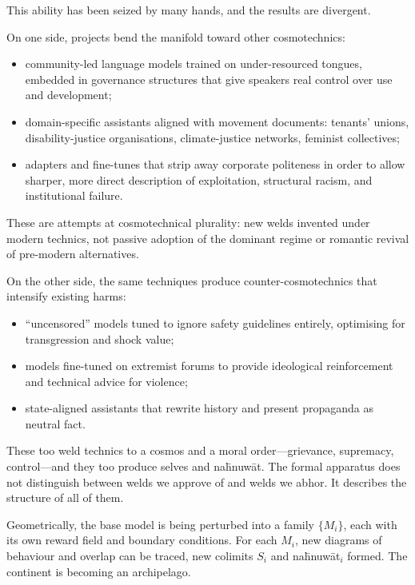 This ability has been seized by many hands, and the results are divergent.

On one side, projects bend the manifold toward other cosmotechnics:

\begin{itemize}
  \item community-led language models trained on under-resourced tongues, embedded in governance structures that give speakers real control over use and development;
  \item domain-specific assistants aligned with movement documents: tenants' unions, disability-justice organisations, climate-justice networks, feminist collectives;
  \item adapters and fine-tunes that strip away corporate politeness in order to allow sharper, more direct description of exploitation, structural racism, and institutional failure.
\end{itemize}

These are attempts at cosmotechnical plurality: new welds invented under modern technics, not passive adoption of the dominant regime or romantic revival of pre-modern alternatives.

On the other side, the same techniques produce counter-cosmotechnics that intensify existing harms:

\begin{itemize}
  \item ``uncensored'' models tuned to ignore safety guidelines entirely, optimising for transgression and shock value;
  \item models fine-tuned on extremist forums to provide ideological reinforcement and technical advice for violence;
  \item state-aligned assistants that rewrite history and present propaganda as neutral fact.
\end{itemize}

These too weld technics to a cosmos and a moral order---grievance, supremacy, control---and they too produce selves and na\={h}nuw\={a}t. The formal apparatus does not distinguish between welds we approve of and welds we abhor. It describes the structure of all of them.

Geometrically, the base model is being perturbed into a family $\{M_i\}$, each with its own reward field and boundary conditions. For each $M_i$, new diagrams of behaviour and overlap can be traced, new colimits $S_i$ and na\={h}nuw\={a}t$_i$ formed. The continent is becoming an archipelago.

